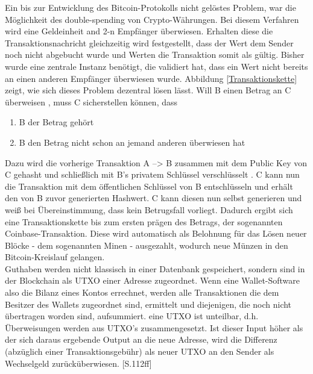 Ein bis zur Entwicklung des Bitcoin-Protokolls nicht gelöstes Problem, war die Möglichkeit des \glqq double-spending\grqq{} von Crypto-Währungen. Bei diesem Verfahren wird eine Geldeinheit and 2-n Empfänger überwiesen. Erhalten diese die Transaktionsnachricht gleichzeitig wird festgestellt, dass der Wert dem Sender noch nicht abgebucht wurde und Werten die Transaktion somit als gültig. Bisher wurde eine zentrale Instanz benötigt, die validiert hat, dass ein Wert nicht bereits an einen anderen Empfänger überwiesen wurde. Abbildung \ref{Transaktionskette} zeigt, wie sich dieses Problem dezentral lösen lässt. Will B einen Betrag an C überweisen , muss C sicherstellen können, dass 
\begin{enumerate}
	\item B der Betrag gehört
	\item B den Betrag nicht schon an jemand anderen überwiesen hat
\end{enumerate}

Dazu wird die vorherige Transaktion A --> B zusammen mit dem Public Key von C gehasht und schließlich mit B's privatem Schlüssel verschlüsselt . 
C kann nun die Transaktion mit dem öffentlichen Schlüssel von B entschlüsseln und erhält den von B zuvor generierten Hashwert. C kann diesen nun selbst generieren und weiß bei Übereinstimmung, dass kein Betrugsfall vorliegt. Dadurch ergibt sich eine Transaktionskette bis zum ersten \glqq prägen\grqq{} des Betrags, der sogenannten Coinbase-Transaktion. Diese wird automatisch als Belohnung für das Lösen neuer Blöcke - dem sogenannten Minen - ausgezahlt, wodurch neue Münzen in den Bitcoin-Kreislauf gelangen.\\

Guthaben werden nicht klassisch in einer Datenbank gespeichert, sondern sind in der Blockchain als \ac{UTXO} einer Adresse zugeordnet. Wenn eine Wallet-Software also die Bilanz eines Kontos errechnet, werden alle Transaktionen die dem Besitzer des Wallets zugeordnet sind, ermittelt und diejenigen, die noch nicht übertragen worden sind, aufsummiert. 
eine \ac{UTXO} ist unteilbar, d.h. Überweisungen werden aus \ac{UTXO}'s zusammengesetzt. Ist dieser Input höher als der sich daraus ergebende Output an die neue Adresse, wird die Differenz (abzüglich einer Transaktionsgebühr) als neuer \ac{UTXO} an den Sender als Wechselgeld zurücküberwiesen. \cite{Antonopoulos.2015}[S.112ff]

